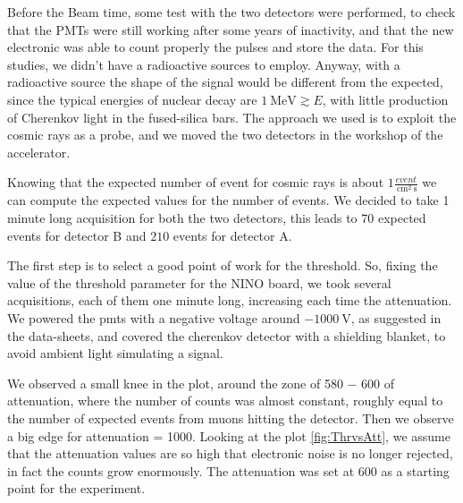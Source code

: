 Before the Beam time, some test with the two detectors were performed, to check that the PMTs were still working after some years of inactivity, and that the new electronic was able to count properly the pulses and store the data. For this studies, we didn't have a radioactive sources to employ. Anyway, with a radioactive source the shape of the signal would be different from the expected, since the typical energies of nuclear decay are $ \SI{1}{\mega \electronvolt} \gtrsim  E$, with little production of Cherenkov light in the fused-silica bars. The approach we used is to exploit the cosmic rays as a probe, and we moved the two detectors in the workshop of the accelerator. 

Knowing that the expected number of event for cosmic rays is about $1 \frac{event}{\SI{}{\centi \meter\squared} \SI{}{\second}}$ we can compute the expected values for the number of events. We decided to take 1 minute long acquisition for both the two detectors, this leads to $70$ expected events for detector B  and  $210$ events for detector A.  \smallskip

The first step is to select a good point of work for the threshold. So, fixing the value of the threshold parameter for the NINO board, we took several acquisitions, each of them one minute long, increasing each time the attenuation. We powered the pmts with a negative voltage around $ \SI{-1000}{\volt}$, as suggested in the data-sheets, and covered the cherenkov detector with a shielding blanket, to avoid ambient light simulating a signal.

\begin{figure}[hbtp]
\centering
{}
\end{figure}

We observed a small knee in the plot, around the zone of 580 − 600 of attenuation, where the number of counts was almost constant, roughly equal to the number of expected events from muons hitting the detector. Then we observe a big edge for attenuation = 1000. Looking at the plot \ref{fig:ThrvsAtt}, we assume that the attenuation values are so high that electronic noise is no longer rejected, in fact the counts grow enormously. The attenuation was set at 600 as a starting point for the experiment.

